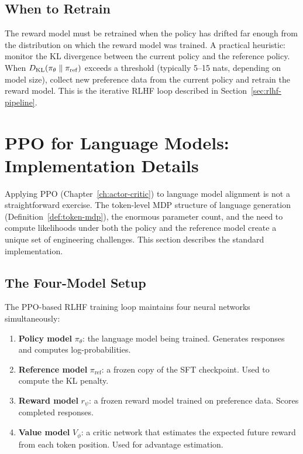 \subsection{When to Retrain}

The reward model must be retrained when the policy has drifted far enough from the distribution on which the reward model was trained. A practical heuristic: monitor the KL divergence between the current policy and the reference policy. When $D_{\mathrm{KL}}\!\left(\pi_\theta\;\|\;\pi_{\mathrm{ref}}\right)$ exceeds a threshold (typically 5--15 nats, depending on model size), collect new preference data from the current policy and retrain the reward model. This is the iterative RLHF loop described in Section~\ref{sec:rlhf-pipeline}.

\section{PPO for Language Models: Implementation Details}
\label{sec:ppo-lm}

Applying PPO (Chapter~\ref{ch:actor-critic}) to language model alignment is not a straightforward exercise. The token-level MDP structure of language generation (Definition~\ref{def:token-mdp}), the enormous parameter count, and the need to compute likelihoods under both the policy and the reference model create a unique set of engineering challenges. This section describes the standard implementation.

\subsection{The Four-Model Setup}
\label{sec:four-models}

The PPO-based RLHF training loop maintains four neural networks simultaneously:
\begin{enumerate}
  \item \textbf{Policy model} $\pi_\theta$: the language model being trained. Generates responses and computes log-probabilities.
  \item \textbf{Reference model} $\pi_{\mathrm{ref}}$: a frozen copy of the SFT checkpoint. Used to compute the KL penalty.
  \item \textbf{Reward model} $r_\psi$: a frozen reward model trained on preference data. Scores completed responses.
  \item \textbf{Value model} $V_\phi$: a critic network that estimates the expected future reward from each token position. Used for advantage estimation.
\end{enumerate}

